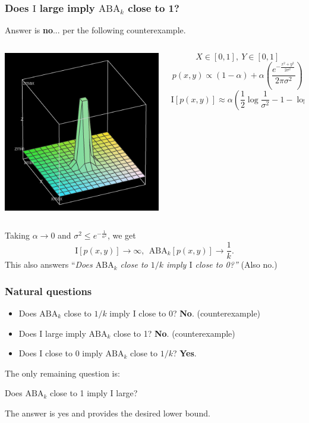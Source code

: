 \documentclass{beamer}
\begin{document}
\begin{frame}
\frametitle{Does $\text{I}$ large imply $\text{ABA}_k$ close to 1?}
Answer is \textbf{no}... per the following counterexample.
\begin{columns}
\begin{column}{0.5\textwidth}
\begin{center}
\includegraphics[scale = 0.3]{witch_hat_func.png}
\end{center}
\end{column}
\begin{column}{0.5\textwidth}
\[
X \in [0,1],\ Y \in [0,1]
\]
\[
p(x, y) \propto (1- \alpha) + \alpha \left( \frac{e^{-\frac{x^2 + y^2}{2\sigma^2}}}{2\pi\sigma^2} \right)
\]
\[
\text{I}[p(x, y)] \approx \alpha(\frac{1}{2}\log \frac{1}{\sigma^2} - 1- \log (2\pi))
\]
\end{column}
\end{columns}
Taking $\alpha \to 0$ and $\sigma^2 \leq e^{-\frac{1}{\alpha^2}}$, we get 
\[\text{I}[p(x, y)] \to \infty,\ \ \text{ABA}_k[p(x, y)] \to \frac{1}{k}.\]
This also answers ``\emph{Does $\text{ABA}_k$ close to $1/k$ imply $\text{I}$ close to 0?''} (Also no.)
\end{frame}

\begin{frame}
\frametitle{Natural questions}

\begin{itemize}
\item Does $\text{ABA}_k$ close to $1/k$ imply $\text{I}$ close to 0? \textbf{No}. (counterexample)
\item Does $\text{I}$ large imply $\text{ABA}_k$ close to 1?  \textbf{No}. (counterexample)
\item Does $\text{I}$ close to $0$ imply $\text{ABA}_k$ close to $1/k$? \textbf{Yes}.
\end{itemize}

The only remaining question is:
\vspace{0.2in}

Does $\text{ABA}_k$ close to 1 imply $\text{I}$ large?
\vspace{0.2in}

The answer is yes and provides the desired lower bound.
\end{frame}
\end{document}
